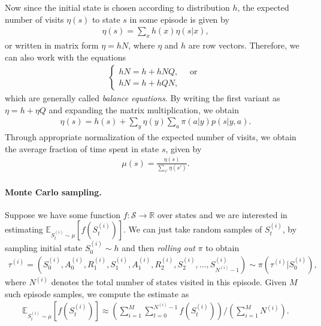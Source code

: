\documentclass[a4paper]{report}
\theoremstyle{definition}
\theoremstyle{plain}
\begin{document}
%
Now since the initial state is chosen according to distribution $h$, the
expected number of visits $\eta(s)$ to state $s$ in some episode is given by
\begin{align*}
  \eta(s) = \sum_{x} h(x) \eta(s | x) ,
\end{align*}
or written in matrix form $\eta = hN$, where $\eta$ and $h$ are row vectors.
%
Therefore, we can also work with the equations
\begin{align*}
  \begin{cases}
  hN = h + hNQ , \quad \text{ or } \\
  hN = h + hQN ,
  \end{cases}
\end{align*}
which are generally called \textit{balance equations}.
By writing the first variant as $\eta = h + \eta Q$ and expanding the matrix
multiplication, we obtain
\begin{align*}
  \eta(s) = h(s) + \sum_{y} \eta(y) \sum_{a} \pi(a|y)p(s|y,a) .
\end{align*}
%
Through appropriate normalization of the expected number of visits, we obtain
the average fraction of time spent in state $s$, given by
\begin{align*}
  \mu(s) = \frac{\eta(s)}{\sum_{s'} \eta(s')} .
\end{align*}

\paragraph{Monte Carlo sampling.}

Suppose we have some function $f : \mathcal{S} \rightarrow \mathbb{R}$ over
states and we are interested in estimating $\mathbb{E}_{S_{t}^{(i)} \sim \mu}[f(S_{t}^{(i)})]$.
%
We can just take random samples of $S_{t}^{(i)}$, by sampling initial state
$S_{0}^{(i)} \sim h$ and then \textit{rolling out} $\pi$ to obtain
\begin{align*}
\tau^{(i)} = (S_{0}^{(i)},A_{0}^{(i)},R_{1}^{(i)},S_{1}^{(i)},A_{1}^{(i)},R_{2}^{(i)},S_{2}^{(i)}, \dots, S_{N^{(i)}-1}^{(i)}) \sim \pi(\tau^{(i)} | S_{0}^{(i)}),
\end{align*}
where $N^{(i)}$ denotes the total number of states visited in this episode.
%
Given $M$ such episode samples, we compute the estimate as
\begin{align*}
  \mathbb{E}_{S_{t}^{(i)} \sim \mu} [ f(S_{t}^{(i)}) ] \approx \left( \sum_{i=1}^{M} \sum_{t=0}^{N^{(i)} - 1} f(S_{t}^{(i)}) \right) / \left( \sum_{i=1}^{M} N^{(i)} \right) .
\end{align*}
\end{document}
